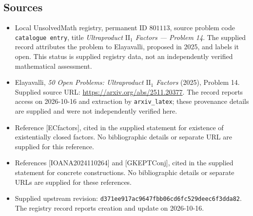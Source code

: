 \documentclass[11pt]{article}
\begin{document}
\subsection{Sources}
\begin{itemize}
\item Local UnsolvedMath registry, permanent ID \(801113\), source problem code \texttt{catalogue entry}, title \emph{Ultraproduct \(\mathrm{II}_1\) Factors --- Problem 14}. The supplied record attributes the problem to Elayavalli, proposed in 2025, and labels it open. This status is supplied registry data, not an independently verified mathematical assessment.
\item Elayavalli, \emph{50 Open Problems: Ultraproduct \(\mathrm{II}_1\) Factors} (2025), Problem 14. Supplied source URL: \url{https://arxiv.org/abs/2511.20377}. The record reports access on 2026-10-16 and extraction by \texttt{arxiv\_latex}; these provenance details are supplied and were not independently verified here.
\item Reference [ECfactors], cited in the supplied statement for existence of existentially closed factors. No bibliographic details or separate URL are supplied for this reference.
\item References [IOANA2024110264] and [GKEPTConj], cited in the supplied statement for concrete constructions. No bibliographic details or separate URLs are supplied for these references.
\item Supplied upstream revision: \texttt{d371ee917ac9647fbb06cd6fc529deec6f3dda82}. The registry record reports creation and update on 2026-10-16.
\end{itemize}
\end{document}

